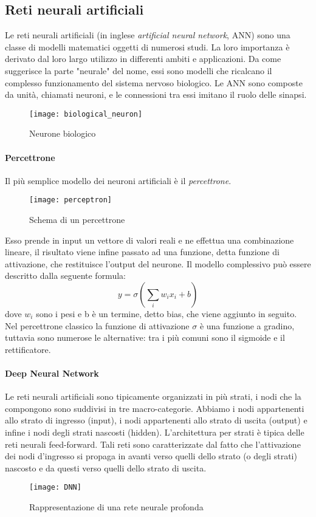 \subsection{Reti neurali artificiali}
Le reti neurali artificiali (in inglese \textit{artificial neural network}, ANN) sono una classe di modelli matematici oggetti di numerosi studi. La loro importanza è derivato dal loro largo utilizzo in differenti ambiti e applicazioni. Da come suggerisce la parte "neurale" del nome, essi sono modelli che ricalcano il complesso funzionamento del sistema nervoso biologico. Le ANN sono composte da unità, chiamati neuroni, e le connessioni tra essi imitano il ruolo delle sinapsi.
\begin{figure}[ht]
    \centering
    \texttt{[image: biological\_neuron]}
    \caption[Neurone biologico]{Neurone biologico}
    \label{biological_neuron}
\end{figure}
\paragraph{Percettrone}
Il più semplice modello dei neuroni artificiali è il \textit{percettrone}. 
\begin{figure}[ht]
    \centering
    \texttt{[image: perceptron]}
    \caption[Percettrone]{Schema di un percettrone}
    \label{biological_neuron}
\end{figure}
Esso prende in input un vettore di valori reali e ne effettua una combinazione lineare, il risultato viene infine passato ad una funzione, detta funzione di attivazione, che restituisce l'output del neurone. Il modello complessivo può essere descritto dalla seguente formula: 
$$y=\sigma(\sum_{i} w_{i}x_{i}+b)$$
dove $w_{i}$ sono i pesi e b è un termine, detto bias, che viene aggiunto in seguito. Nel percettrone classico la funzione di attivazione $\sigma$ è una funzione a gradino, tuttavia sono numerose le alternative: tra i più comuni sono il sigmoide e il rettificatore.
\paragraph{Deep Neural Network} 
Le reti neurali artificiali sono tipicamente organizzati in più strati, i nodi che la compongono sono suddivisi in tre macro-categorie. Abbiamo i nodi appartenenti allo strato di ingresso (input), i nodi appartenenti allo strato di uscita (output) e infine i nodi degli strati nascosti (hidden). L’architettura per strati è tipica delle reti neurali feed-forward. Tali reti sono caratterizzate dal fatto che l’attivazione dei nodi d’ingresso si propaga in avanti verso quelli dello strato (o degli strati) nascosto e da questi verso quelli dello strato di uscita.
\begin{figure}[ht]
    \centering
    \texttt{[image: DNN]}
    \caption[Deep Neural Network]{Rappresentazione di una rete neurale profonda}
    \label{DNN}
\end{figure}

